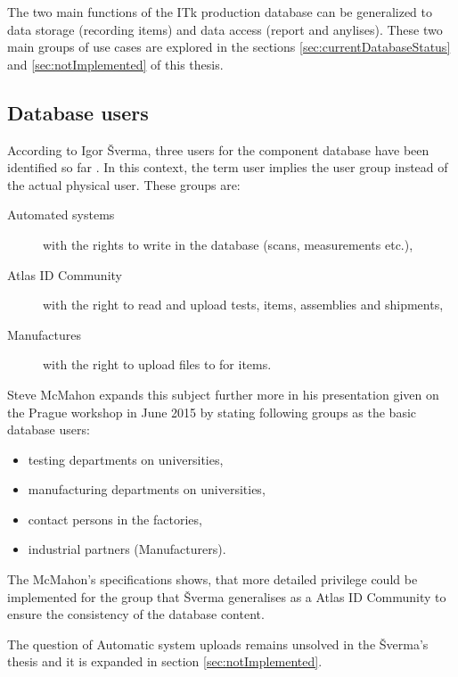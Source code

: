 \par The two main functions of the ITk production database can be generalized to data storage (recording items) and data access (report and anylises). These two main groups of use cases are explored in the sections \ref{sec:currentDatabaseStatus} and \ref{sec:notImplemented} of this thesis.


\subsection{Database users}
\par According to Igor Šverma, three users for the component database have been identified so far \cite[page 22]{sverma}. In this context, the term user implies the user group instead of the actual physical user. These groups are:

\begin{description}
	\item[Automated systems] with the rights to write in the database (scans, measurements etc.),
	\item[Atlas ID Community] with the right to read and upload tests, items, assemblies and shipments,
	\item[Manufactures] with the right to upload files to for items.
\end{description}


\par Steve McMahon expands this subject further more in his presentation given on the Prague workshop in June 2015 \cite{databasePresentation} by stating following groups as the basic database users:

\begin{itemize}
	\item testing departments on universities,
	\item manufacturing departments on universities,
	\item contact persons in the factories,
	\item industrial partners (Manufacturers).
\end{itemize}

\par The McMahon's specifications shows, that more detailed privilege could be implemented for the group that Šverma generalises as a Atlas ID Community to ensure the consistency of the database content.

\par The question of Automatic system uploads remains unsolved in the Šverma's thesis and it is expanded in section \ref{sec:notImplemented}.



